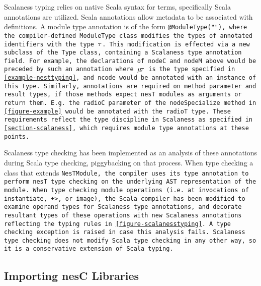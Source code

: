 Scalaness typing relies on native Scala syntax for terms, specifically Scala annotations are
utilized. Scala annotations allow metadata to be associated with definitions. A module type
annotation is of the form \tt{@ModuleType(\texttt{"}\jmodtcat\texttt{"})}, where the
compiler-defined \tt{ModuleType} class modifies the types of annotated identifiers with the type
$\tau$. This modification is effected via a new subclass of the \tt{Type} class, containing a
Scalaness type annotation field. For example, the declarations of \tt{nodeC} and \tt{nodeM}
above would be preceded by such an annotation where $\mu\!\tau$ is the type specified in
\autoref{example-nesttyping}, and \tt{ncode} would be annotated with an instance of this type.
Similarly, annotations are required on method parameter and result types, if those methods
expect nesT modules as arguments or return them. E.g.~the \tt{radioC} parameter of the
\tt{nodeSpecialize} method in \autoref{figure-example} would be annotated with the \tt{radioT}
type. These requirements reflect the type discipline in Scalaness as specified in
\autoref{section-scalaness}, which requires module type annotations at these points.

Scalaness type checking has been implemented as an analysis of these annotations during Scala
type checking, piggybacking on that process. When type checking a class that extends
\tt{NesTModule}, the compiler uses its type annotation to perform nesT type checking on the
underlying AST representation of the module. When type checking module operations (i.e.~at
invocations of \tt{instantiate}, \tt{+\!\!>}, or \tt{image}), the Scala compiler has been
modified to examine operand types for Scalaness type annotations, and decorate resultant types
of these operations with new Scalaness annotations reflecting the typing rules in
\autoref{figure-scalanesstyping}. A type checking exception is raised in case this analysis
fails. Scalaness type checking does not modify Scala type checking in any other way, so it is a
conservative extension of Scala typing.



\subsection{Importing nesC Libraries}
\label{section-libraries}

